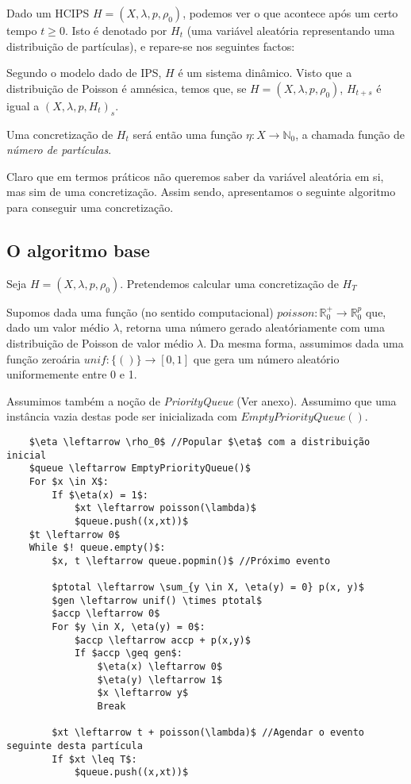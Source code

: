 \documentclass{article}
\newcommand{\N}{\mathbb{N}}
\newcommand{\R}{\mathbb{R}}
\begin{document}
	Dado um HCIPS $H = (X, \lambda, p, \rho_0)$, podemos ver o que acontece após um certo tempo $t \geq 0$. Isto é denotado por $H_t$ (uma variável aleatória representando uma distribuição de partículas), e repare-se nos seguintes factos:
	
	Segundo o modelo dado de IPS, $H$ é um sistema dinâmico. Visto que a distribuição de Poisson é amnésica, temos que, se $H = (X, \lambda, p, \rho_0)$, $H_{t+s}$ é igual a $(X, \lambda, p, H_t)_s$.
	
	Uma concretização de $H_t$ será então uma função $\eta : X \rightarrow \N_0$, a chamada função de \emph{número de partículas}.
	
	Claro que em termos práticos não queremos saber da variável aleatória em si, mas sim de uma concretização. Assim sendo, apresentamos o seguinte algoritmo para conseguir uma concretização.
	
	\subsection{O algoritmo base}
	
	Seja $H = (X, \lambda, p, \rho_0)$. Pretendemos calcular uma concretização de $H_T$
	
	Supomos dada uma função (no sentido computacional) $poisson : \R^+_0 \rightarrow \R^p_0$ que, dado um valor médio $\lambda$, retorna uma número gerado aleatóriamente com uma distribuição de Poisson de valor médio $\lambda$. Da mesma forma, assumimos dada uma função zeroária $unif : \{()\} \rightarrow [0,1]$ que gera um número aleatório uniformemente entre 0 e 1.
	
	Assumimos também a noção de \emph{PriorityQueue} (Ver anexo). Assumimo que uma instância vazia destas pode ser inicializada com $EmptyPriorityQueue()$.
	
	\begin{lstlisting}
	$\eta \leftarrow \rho_0$ //Popular $\eta$ com a distribuição inicial
	$queue \leftarrow EmptyPriorityQueue()$
	For $x \in X$:
		If $\eta(x) = 1$:
			$xt \leftarrow poisson(\lambda)$
			$queue.push((x,xt))$
	$t \leftarrow 0$
	While $! queue.empty()$:
		$x, t \leftarrow queue.popmin()$ //Próximo evento
		
		$ptotal \leftarrow \sum_{y \in X, \eta(y) = 0} p(x, y)$
		$gen \leftarrow unif() \times ptotal$
		$accp \leftarrow 0$
		For $y \in X, \eta(y) = 0$:
			$accp \leftarrow accp + p(x,y)$
			If $accp \geq gen$:
				$\eta(x) \leftarrow 0$
				$\eta(y) \leftarrow 1$
				$x \leftarrow y$
				Break
		
		$xt \leftarrow t + poisson(\lambda)$ //Agendar o evento seguinte desta partícula
		If $xt \leq T$:
			$queue.push((x,xt))$
	\end{lstlisting}
	
\end{document}
